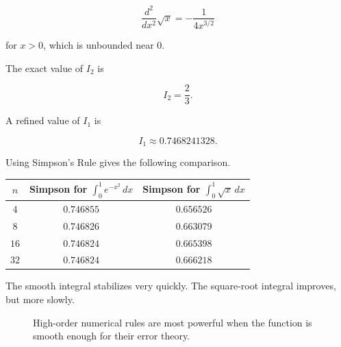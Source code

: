 \[
\frac{d^2}{dx^2}\sqrt{x}
=
-\frac{1}{4x^{3/2}}
\]

for \(x>0\), which is unbounded near \(0\).

The exact value of \(I_2\) is

\[
I_2=\frac23.
\]

A refined value of \(I_1\) is

\[
I_1\approx0.7468241328.
\]

Using Simpson's Rule gives the following comparison.

\begin{center}
\begin{tabular}{c|c|c}
\(n\) & Simpson for \(\int_0^1 e^{-x^2}\,dx\) & Simpson for \(\int_0^1 \sqrt{x}\,dx\) \\ \hline
\(4\) & \(0.746855\) & \(0.656526\) \\
\(8\) & \(0.746826\) & \(0.663079\) \\
\(16\) & \(0.746824\) & \(0.665398\) \\
\(32\) & \(0.746824\) & \(0.666218\)
\end{tabular}
\end{center}

The smooth integral stabilizes very quickly.  The square-root integral improves, but more
slowly.

\begin{figure}[h]
\centering
\begin{minipage}{0.47\textwidth}
\centering
{}
\end{minipage}
\hfill
\begin{minipage}{0.47\textwidth}
\centering
{}
\end{minipage}
\caption{High-order numerical rules are most powerful when the function is smooth enough for their error theory.}
\label{fig:smooth-vs-rough-integration}
\end{figure}

